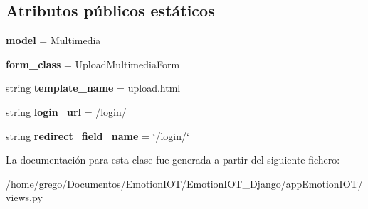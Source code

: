 \subsection*{Atributos públicos estáticos}
\begin{DoxyCompactItemize}
\item 
{\bfseries model} = Multimedia\hypertarget{classappEmotionIOT_1_1views_1_1Multimedia__update_a39daae0d7e660ad3f21fc47ac683685f}{}\label{classappEmotionIOT_1_1views_1_1Multimedia__update_a39daae0d7e660ad3f21fc47ac683685f}

\item 
{\bfseries form\+\_\+class} = Upload\+Multimedia\+Form\hypertarget{classappEmotionIOT_1_1views_1_1Multimedia__update_a4f8a365942569c6760e278491483e9fa}{}\label{classappEmotionIOT_1_1views_1_1Multimedia__update_a4f8a365942569c6760e278491483e9fa}

\item 
string {\bfseries template\+\_\+name} = \textquotesingle{}upload.\+html\textquotesingle{}\hypertarget{classappEmotionIOT_1_1views_1_1Multimedia__update_a0ccabf2418f22eea3ae9716feef5ec34}{}\label{classappEmotionIOT_1_1views_1_1Multimedia__update_a0ccabf2418f22eea3ae9716feef5ec34}

\item 
string {\bfseries login\+\_\+url} = \textquotesingle{}/login/\textquotesingle{}\hypertarget{classappEmotionIOT_1_1views_1_1Multimedia__update_aee7cded23aa7e7746870e518f1884528}{}\label{classappEmotionIOT_1_1views_1_1Multimedia__update_aee7cded23aa7e7746870e518f1884528}

\item 
string {\bfseries redirect\+\_\+field\+\_\+name} = \char`\"{}/login/\char`\"{}\hypertarget{classappEmotionIOT_1_1views_1_1Multimedia__update_a19f24d0ff2e3a4d735bd37b257b7d218}{}\label{classappEmotionIOT_1_1views_1_1Multimedia__update_a19f24d0ff2e3a4d735bd37b257b7d218}

\end{DoxyCompactItemize}


La documentación para esta clase fue generada a partir del siguiente fichero\+:\begin{DoxyCompactItemize}
\item 
/home/grego/\+Documentos/\+Emotion\+I\+O\+T/\+Emotion\+I\+O\+T\+\_\+\+Django/app\+Emotion\+I\+O\+T/views.\+py\end{DoxyCompactItemize}
